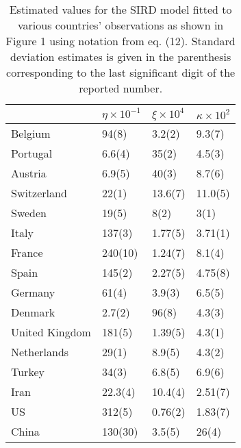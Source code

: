 \documentclass{article}
\begin{document}
\begin{table}
\label{tab:sird}
\centering
\caption{Estimated values for the SIRD model fitted to various countries' observations as shown in Figure 1 using notation from eq. (12). Standard deviation estimates is given in the parenthesis corresponding to the last significant digit of the reported number.}
\begin{tabular}{llll}
\toprule
{} &           $\eta\times 10^{-1}$ &      $\xi \times 10^{4}$ &            $\kappa\times 10^{2}$ \\
\midrule
Belgium        &    94(8) &   3.2(2) &   9.3(7) \\
Portugal       &   6.6(4) &    35(2) &   4.5(3) \\
Austria        &   6.9(5) &    40(3) &   8.7(6) \\
Switzerland    &    22(1) &  13.6(7) &  11.0(5) \\
Sweden         &    19(5) &     8(2) &     3(1) \\
Italy          &   137(3) &  1.77(5) &  3.71(1) \\
France         &  240(10) &  1.24(7) &   8.1(4) \\
Spain          &   145(2) &  2.27(5) &  4.75(8) \\
Germany        &    61(4) &   3.9(3) &   6.5(5) \\
Denmark        &   2.7(2) &    96(8) &   4.3(3) \\
United Kingdom &   181(5) &  1.39(5) &   4.3(1) \\
Netherlands    &    29(1) &   8.9(5) &   4.3(2) \\
Turkey         &    34(3) &   6.8(5) &   6.9(6) \\
Iran           &  22.3(4) &  10.4(4) &  2.51(7) \\
US             &   312(5) &  0.76(2) &  1.83(7) \\
China          &  130(30) &   3.5(5) &    26(4) \\
\bottomrule
\end{tabular}

\end{table}
\end{document}
